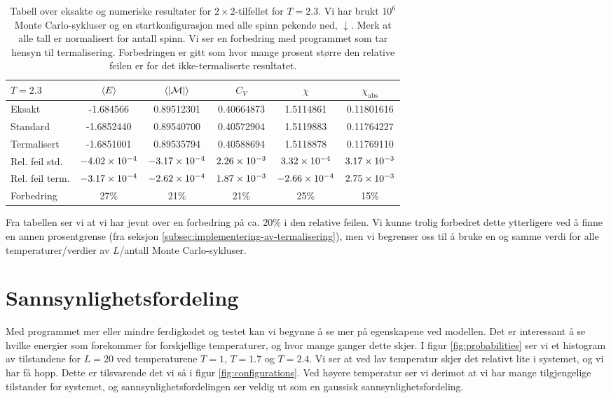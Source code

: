 \documentclass[11pt]{article}
\newcommand{\abs}[1]{|#1|}
\begin{document}
\begin{table}
\centering
\caption{Tabell over eksakte og numeriske resultater for $2\times
  2$-tilfellet for $T=2.3$. Vi har brukt $10^6$ Monte Carlo-sykluser og
  en startkonfigurasjon med alle spinn pekende ned, $\downarrow$. Merk at
alle tall er normalisert for antall spinn. Vi ser en forbedring
med programmet som tar hensyn til termalisering. Forbedringen er gitt
som hvor mange prosent større den relative feilen er for det
ikke-termaliserte resultatet.}
\label{tab:exact-numerical-improved}
\vspace{0.1cm}
\begin{tabular}{l|ccccc}
$T=2.3$ & $\langle E \rangle$ & $\mean{ \abs{\mathcal{M} } }$ & $C_V$ & $\chi$ & $\chi_\text{abs}$ \\
\hline
Eksakt          & -1.684566     & 0.89512301    & 0.40664873   & 1.5114861 & 0.11801616 \\
Standard        & -1.6852440    & 0.89540700    & 0.40572904   & 1.5119883 & 0.11764227 \\
Termalisert     & -1.6851001    & 0.89535794    & 0.40588694   & 1.5118878 & 0.11769110\\
Rel. feil std.  & $-4.02\times 10^{-4}$ & $-3.17\times 10^{-4}$ & $2.26\times 10^{-3}$ & $3.32\times 10^{-4}$ & $3.17\times 10^{-3}$ \\
Rel. feil term. & $-3.17\times 10^{-4}$ & $-2.62\times 10^{-4}$ & $1.87\times 10^{-3}$ &
                                                                 $-2.66\times 10^{-4}$ & $2.75\times 10^{-3}$\\
Forbedring  & 27\% & 21\% & 21\% & 25\% & 15\%
\end{tabular}
\end{table}

Fra tabellen ser vi at vi har jevnt over en forbedring på ca. $20\%$ i
den relative feilen. Vi kunne trolig forbedret dette ytterligere ved å
finne en annen prosentgrense (fra seksjon
\ref{subsec:implementering-av-termalisering}), men vi begrenser oss
til å bruke en og samme verdi for alle temperaturer/verdier av
$L$/antall Monte Carlo-sykluser. 

\section{Sannsynlighetsfordeling}
Med programmet mer eller mindre ferdigkodet og testet kan vi begynne
å se mer på egenskapene ved modellen. Det er interessant å se hvilke
energier som forekommer for forskjellige temperaturer, og hvor mange ganger dette skjer.
I figur \ref{fig:probabilities} ser vi et histogram av tilstandene
for $L=20$ ved temperaturene $T=1$, $T=1.7$ og $T=2.4$. Vi ser at ved lav temperatur
skjer det relativt lite i systemet, og vi har få hopp. Dette er tilsvarende
det vi så i figur \ref{fig:configurations}. Ved høyere temperatur ser vi derimot
at vi har mange tilgjengelige tilstander for systemet, og 
sannsynlighetsfordelingen ser veldig ut som en gaussisk sannsynlighetsfordeling.
\end{document}

